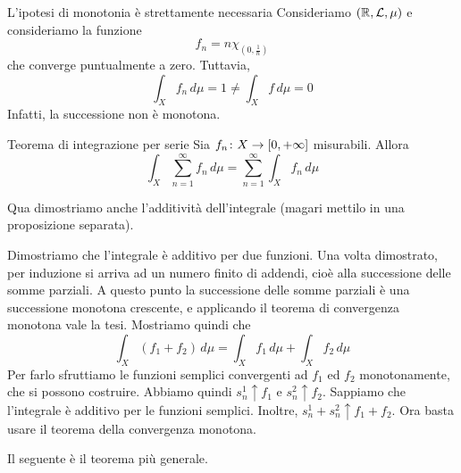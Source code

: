 \documentclass[a4paper]{article}
\begin{document}
\begin{radioactive}
\begin{snippetexample}{L'ipotesi di monotonia è strettamente necessaria}
    Consideriamo \((\mathbb{R}, \mathcal L, \mu)\)
    e consideriamo la funzione
    \[
        f_n = n \chi_{\left(0, \frac1n\right)}
    \]
    che converge puntualmente a zero. Tuttavia,
    \[
        \int_X f_n \,d\mu = 1 \neq \int_X f \,d\mu = 0
    \]
    Infatti, la successione non è monotona.
\end{snippetexample}
\end{radioactive}

\begin{radioactive}
\begin{snippettheorem}{Teorema di integrazione per serie}
    Sia \(f_n \colon X \to [0,+\infty]\)
    misurabili. Allora
    \[
        \int_X \sum_{n=1}^\infty f_n \,d\mu
        = \sum_{n=1}^{\infty}\int_X f_n\,d\mu
    \]
\end{snippettheorem}
\end{radioactive}

\begin{radioactive}
Qua dimostriamo anche l'additività dell'integrale (magari mettilo in una proposizione separata).
\end{radioactive}

\begin{radioactive}
\begin{snippetproof}{}
    Dimostriamo che l'integrale è additivo per due funzioni.
    Una volta dimostrato, per induzione si arriva ad un numero finito di addendi, cioè alla successione delle somme parziali.
    A questo punto la successione delle somme parziali è una successione monotona crescente,
    e applicando il teorema di convergenza monotona vale la tesi.
    Mostriamo quindi che
    \[
        \int_X (f_1 + f_2)\,d\mu
        = \int_X f_1\,d\mu + \int_X f_2\,d\mu
    \]
    Per farlo sfruttiamo le funzioni semplici convergenti ad \(f_1\) ed \(f_2\)
    monotonamente, che si possono costruire. Abbiamo quindi \(s_n^1 \uparrow f_1\)
    e \(s_n^2 \uparrow f_2\). Sappiamo che l'integrale è additivo per le funzioni semplici.
    Inoltre, \(s_n^1 + s_n^2 \uparrow f_1 + f_2\).
    Ora basta usare il teorema della convergenza monotona.
\end{snippetproof}
\end{radioactive}

\begin{radioactive}
Il seguente è il teorema più generale.
\end{radioactive}
\end{document}
